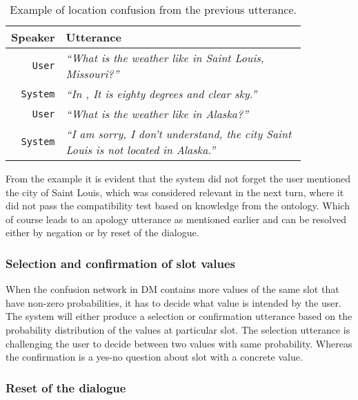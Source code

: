 \begin{table}[h]
\centering
\begin{tabular}{ | r | p{0.85\linewidth} | } \hline
	\textbf{Speaker} & \textbf{Utterance} \\ \hline
	\texttt{User} & \textit{``What is the weather like in Saint Louis, Missouri?''} \\ \hline
	\texttt{System} & \textit{``In , It is eighty degrees and clear sky.''} \\ \hline
	\texttt{User} & \textit{``What is the weather like in Alaska?''} \\ \hline
	\texttt{System} & \textit{``I am sorry, I don't understand, the city Saint Louis is not located in Alaska.''} \\ \hline
\end{tabular}
\caption[Orthogonal time queries]{Example of location confusion from the previous utterance.}
\label{table:confusion}
\end{table}

From the example it is evident that the system did not forget the user mentioned the city of Saint Louis, which was considered relevant in the next turn, where it did not pass the compatibility test based on knowledge from the ontology.
Which of course leads to an apology utterance as mentioned earlier and can be resolved either by negation or by reset of the dialogue.


\subsubsection{Selection and confirmation of slot values}

When the confusion network in \ac{DM} contains more values of the same slot that have non-zero probabilities, it has to decide what value is intended by the user.
The system will either produce a selection or confirmation utterance based on the probability distribution of the values at particular slot.
The selection utterance is challenging the user to decide between two values with same probability.
Whereas the confirmation is a yes-no question about slot with a concrete value.

\subsubsection{Reset of the dialogue}

